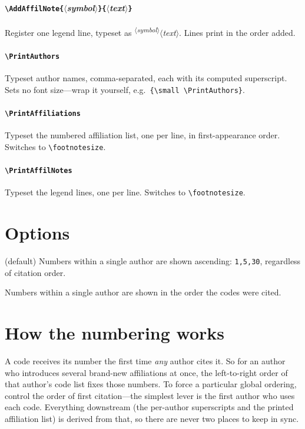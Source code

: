 \documentclass[11pt]{article}
\newcommand{\cs}[1]{\texttt{\textbackslash #1}}
\newcommand{\meta}[1]{$\langle$\textit{#1}$\rangle$}
\begin{document}
\paragraph{\cs{AddAffilNote}\texttt{\{}\meta{symbol}\texttt{\}\{}\meta{text}\texttt{\}}}
Register one legend line, typeset as \textsuperscript{\meta{symbol}}\meta{text}. Lines print
in the order added.

\paragraph{\cs{PrintAuthors}}
Typeset author names, comma-separated, each with its computed superscript. Sets
no font size---wrap it yourself, e.g.\ \texttt{\{\cs{small} \cs{PrintAuthors}\}}.

\paragraph{\cs{PrintAffiliations}}
Typeset the numbered affiliation list, one per line, in first-appearance order.
Switches to \cs{footnotesize}.

\paragraph{\cs{PrintAffilNotes}}
Typeset the legend lines, one per line. Switches to \cs{footnotesize}.

\section{Options}
\begin{description}[leftmargin=2.2cm,style=nextline,font=\ttfamily]
  \item[\lbrack sort\rbrack] (default) Numbers within a single author are shown
    ascending: \texttt{1,5,30}, regardless of citation order.
  \item[\lbrack nosort\rbrack] Numbers within a single author are shown in the
    order the codes were cited.
\end{description}

\section{How the numbering works}
A code receives its number the first time \emph{any} author cites it. So for an
author who introduces several brand-new affiliations at once, the left-to-right
order of that author's code list fixes those numbers. To force a particular
global ordering, control the order of first citation---the simplest lever is the
first author who uses each code. Everything downstream (the per-author
superscripts and the printed affiliation list) is derived from that, so there
are never two places to keep in sync.
\end{document}
